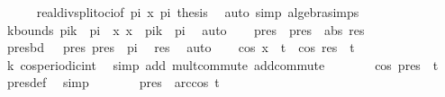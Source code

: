 \begin{isabellebody}
\ \ \ \ \isamarkupfalse%
\ real{\isacharunderscore}{\kern0pt}div{\isacharunderscore}{\kern0pt}split{\isacharunderscore}{\kern0pt}oci{\isacharbrackleft}{\kern0pt}of\ {\isachardoublequoteopen}{}{\isacharasterisk}{\kern0pt}pi{\isachardoublequoteclose}\ x\ {\isachardoublequoteopen}{\isacharminus}{\kern0pt}pi{\isachardoublequoteclose}\ thesis{\isacharbrackright}{\kern0pt}\ \isamarkupfalse%
\ {\isacharparenleft}{\kern0pt}auto\ simp{\isacharcolon}{\kern0pt}\ algebra{\isacharunderscore}{\kern0pt}simps{\isacharparenright}{\kern0pt}\isanewline
\ \ \isamarkupfalse%
\ kbounds{\isacharcolon}{\kern0pt}\ {\isachardoublequoteopen}{}{\isacharasterisk}{\kern0pt}pi{\isacharasterisk}{\kern0pt}k\ {\isacharminus}{\kern0pt}\ pi\ {\isacharless}{\kern0pt}\ x{\isachardoublequoteclose}\ {\isachardoublequoteopen}x\ {\isasymle}\ {}{\isacharasterisk}{\kern0pt}pi{\isacharasterisk}{\kern0pt}k\ {\isacharplus}{\kern0pt}\ pi{\isachardoublequoteclose}\ \isamarkupfalse%
\ auto\isanewline
\ \ \isamarkupfalse%
\ pres\ \ {\isachardoublequoteopen}pres\ {\isacharequal}{\kern0pt}\ abs\ res{\isachardoublequoteclose}\isanewline
\ \ \isamarkupfalse%
\ presbd{\isacharcolon}{\kern0pt}\ {\isachardoublequoteopen}{}\ {\isasymle}\ pres{\isachardoublequoteclose}\ {\isachardoublequoteopen}pres\ {\isasymle}\ pi{\isachardoublequoteclose}\ \isamarkupfalse%
\ res\ \isamarkupfalse%
\ auto\isanewline
\ \ \isamarkupfalse%
\ {\isachardoublequoteopen}cos\ x\ {\isachargreater}{\kern0pt}\ t\ {\isasymlongleftrightarrow}\ cos\ res\ {\isachargreater}{\kern0pt}\ t{\isachardoublequoteclose}\ \isamarkupfalse%
\ k\ cos{\isacharunderscore}{\kern0pt}periodic{\isacharunderscore}{\kern0pt}int\ \isamarkupfalse%
\ {\isacharparenleft}{\kern0pt}simp\ add{\isacharcolon}{\kern0pt}\ mult{\isachardot}{\kern0pt}commute\ add{\isachardot}{\kern0pt}commute{\isacharparenright}{\kern0pt}\isanewline
\ \ \isamarkupfalse%
\ \isamarkupfalse%
\ {\isachardoublequoteopen}{\isasymdots}\ {\isasymlongleftrightarrow}\ cos\ pres\ {\isachargreater}{\kern0pt}\ t{\isachardoublequoteclose}\ \isamarkupfalse%
\ pres{\isacharunderscore}{\kern0pt}def\ \isamarkupfalse%
\ simp\isanewline
\ \ \isamarkupfalse%
\ \isamarkupfalse%
\ {\isachardoublequoteopen}{\isasymdots}\ {\isasymlongleftrightarrow}\ pres\ {\isacharless}{\kern0pt}\ arccos\ t{\isachardoublequoteclose}\ \isamarkupfalse%

\end{isabellebody}
